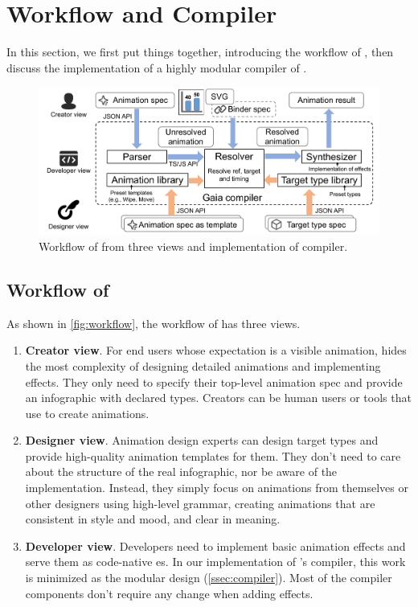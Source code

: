 \section{Workflow and \gaia{} Compiler}
\label{sec:workflow}

In this section, we first put things together, introducing the workflow of \gaia{}, then discuss the implementation of a highly modular compiler of \gaia{}.

\begin{figure}[h]
  \centering
  \includegraphics[width=0.8\linewidth]{figs/workflow.pdf}
  \caption{Workflow of \gaia{} from three views and implementation of \gaia{} compiler.}
  \label{fig:workflow}
\end{figure}

\subsection{Workflow of \gaia{}}


As shown in \autoref{fig:workflow}, the workflow of \gaia{} has three views.

\begin{enumerate}
\item \textbf{Creator view}.
For end users whose expectation is a visible animation, \gaia{} hides the most complexity of designing detailed animations and implementing effects. 
They only need to specify their top-level animation spec and provide an infographic with declared types. 
Creators can be human users or tools that use \gaia{} to create animations.

\item \textbf{Designer view}.
Animation design experts can design target types and provide high-quality animation templates for them.
They don't need to care about the structure of the real infographic, nor be aware of the implementation. 
Instead, they simply focus on animations from themselves or other designers using high-level grammar, creating animations that are consistent in style and mood, and clear in meaning.

\item \textbf{Developer view}.
Developers need to implement basic animation effects and serve them as code-native \aniclass{}es. In our implementation of \gaia{}'s compiler, this work is minimized as the modular design (\autoref{ssec:compiler}).
Most of the \gaia{} compiler components don't require any change when adding effects.

\end{enumerate}


